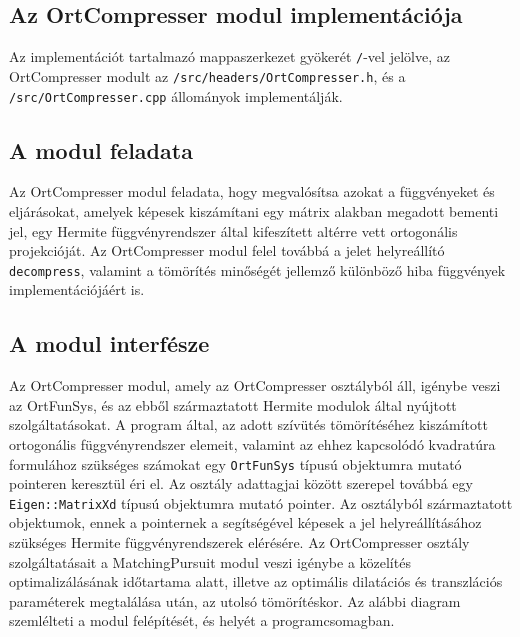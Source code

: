 \documentclass[oneside,titlepage,12pt,a4paper]{report}
\begin{document}
\subsection{Az OrtCompresser modul implementációja} \label{subsec::ortcompr}

Az implementációt tartalmazó mappaszerkezet gyökerét \texttt{/}-vel jelölve, az OrtCompresser modult  az \texttt{/src/headers/OrtCompresser.h}, és a \texttt{/src/OrtCompresser.cpp} állományok implementálják.

\subsection*{A modul feladata}

Az OrtCompresser modul feladata, hogy megvalósítsa azokat a függvényeket és eljárásokat, amelyek képesek kiszámítani egy mátrix alakban megadott bementi jel, egy Hermite függvényrendszer által kifeszített altérre vett ortogonális projekcióját. Az OrtCompresser modul felel továbbá a jelet helyreállító  \texttt{decompress}, valamint a tömörítés minőségét jellemző különböző hiba függvények implementációjáért is.

\subsection*{A modul interfésze}

\par Az OrtCompresser modul, amely az OrtCompresser osztályból áll, igénybe veszi az OrtFunSys, és az ebből származtatott Hermite modulok által nyújtott szolgáltatásokat. A program által, az adott szívütés tömörítéséhez kiszámított ortogonális függvényrendszer elemeit, valamint az ehhez kapcsolódó kvadratúra formulához szükséges számokat egy \texttt{OrtFunSys} típusú objektumra mutató pointeren keresztül éri el. Az osztály adattagjai között szerepel továbbá egy \texttt{Eigen::MatrixXd} típusú objektumra mutató pointer. Az osztályból származtatott objektumok, ennek a pointernek a segítségével képesek a jel helyreállításához szükséges Hermite függvényrendszerek elérésére. Az OrtCompresser osztály szolgáltatásait a MatchingPursuit modul veszi igénybe a közelítés optimalizálásának időtartama alatt, illetve az optimális dilatációs és transzlációs paraméterek megtalálása után, az utolsó tömörítéskor. Az alábbi diagram szemlélteti a modul felépítését, és helyét a programcsomagban.
\end{document}
